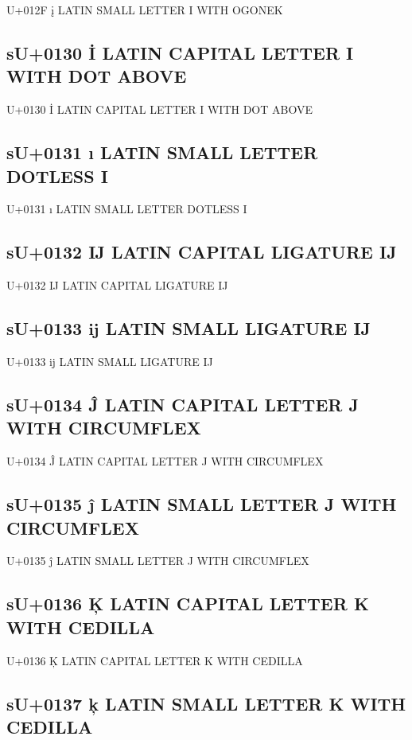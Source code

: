 U+012F į  LATIN SMALL LETTER I WITH OGONEK

\subsection{sU+0130 İ  LATIN CAPITAL LETTER I WITH DOT ABOVE}

U+0130 İ  LATIN CAPITAL LETTER I WITH DOT ABOVE

\subsection{sU+0131 ı  LATIN SMALL LETTER DOTLESS I}

U+0131 ı  LATIN SMALL LETTER DOTLESS I

\subsection{sU+0132 Ĳ  LATIN CAPITAL LIGATURE IJ}

U+0132 Ĳ  LATIN CAPITAL LIGATURE IJ

\subsection{sU+0133 ĳ  LATIN SMALL LIGATURE IJ}

U+0133 ĳ  LATIN SMALL LIGATURE IJ

\subsection{sU+0134 Ĵ  LATIN CAPITAL LETTER J WITH CIRCUMFLEX}

U+0134 Ĵ  LATIN CAPITAL LETTER J WITH CIRCUMFLEX

\subsection{sU+0135 ĵ  LATIN SMALL LETTER J WITH CIRCUMFLEX}

U+0135 ĵ  LATIN SMALL LETTER J WITH CIRCUMFLEX

\subsection{sU+0136 Ķ  LATIN CAPITAL LETTER K WITH CEDILLA}

U+0136 Ķ  LATIN CAPITAL LETTER K WITH CEDILLA

\subsection{sU+0137 ķ  LATIN SMALL LETTER K WITH CEDILLA}


